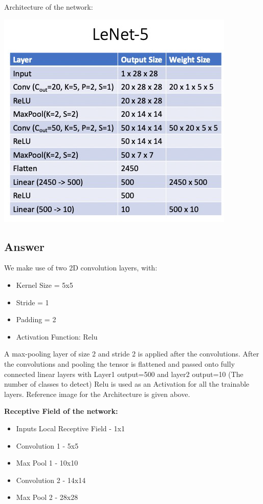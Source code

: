 \documentclass[
	12pt, %
]{fphw}
\begin{document}
\begin{problem}
	Architecture of the network:
\end{problem}
\begin{center}
	\includegraphics[width=0.45\columnwidth]{lenet5arch.png} 
\end{center}

\subsection*{Answer}

We make use of two 2D convolution layers, with:
\begin{itemize}
	\item Kernel Size = 5x5
	\item Stride = 1
	\item Padding = 2
	\item Activation Function: Relu
\end{itemize}

\noindent A max-pooling layer of size 2 and stride 2 is applied after the convolutions. After the convolutions and pooling the tensor is flattened and passed onto fully connected linear layers with Layer1 output=500 and layer2 output=10 (The number of classes to detect)
Relu is used as an Activation for all the trainable layers. 
Reference image for the Architecture is given above.
\newline

\noindent\textbf{Receptive Field of the network:} 

\begin{itemize}
	\item Inputs Local Receptive Field - 1x1
	\item Convolution 1 - 5x5
	\item Max Pool 1 - 10x10
	\item Convolution 2 - 14x14
	\item Max Pool 2 - 28x28
\end{itemize}
\end{document}
